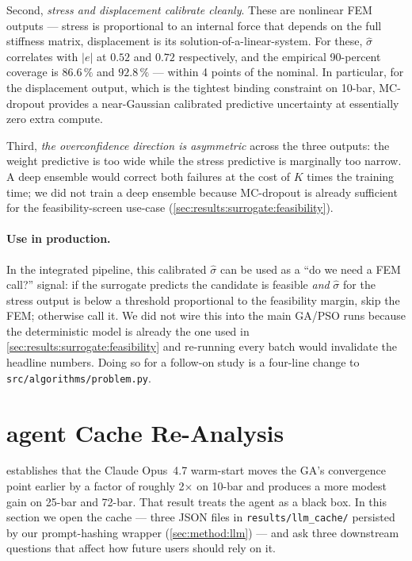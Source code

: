 Second, \emph{stress and displacement calibrate cleanly}. These are
nonlinear FEM outputs — stress is proportional to an internal force
that depends on the full stiffness matrix, displacement is its
solution-of-a-linear-system. For these, $\hat\sigma$ correlates
with $|e|$ at $\num{0.52}$ and $\num{0.72}$ respectively, and the
empirical \num{90}-percent coverage is $\num{86.6}\,\%$ and
$\num{92.8}\,\%$ --- within \num{4} points of the nominal.
In particular, for the displacement output, which is the tightest
binding constraint on \num{10}-bar, MC-dropout provides a
near-Gaussian calibrated predictive uncertainty at essentially
zero extra compute.

Third, \emph{the overconfidence direction is asymmetric} across
the three outputs: the weight predictive is too wide while the
stress predictive is marginally too narrow. A deep ensemble would
correct both failures at the cost of $K$ times the training time;
we did not train a deep ensemble because MC-dropout is already
sufficient for the feasibility-screen use-case
(\cref{sec:results:surrogate:feasibility}).

\paragraph{Use in production.} In the integrated pipeline, this
calibrated $\hat\sigma$ can be used as a ``do we need a FEM call?''
signal: if the surrogate predicts the candidate is feasible
\emph{and} $\hat\sigma$ for the stress output is below a threshold
proportional to the feasibility margin, skip the FEM; otherwise
call it. We did not wire this into the main GA/PSO runs because
the deterministic model is already the one used in
\cref{sec:results:surrogate:feasibility} and re-running every
batch would invalidate the headline numbers. Doing so for a
follow-on study is a four-line change to
\texttt{src/algorithms/problem.py}.

\section{agent Cache Re-Analysis}
\label{sec:results:llm_cache}

 establishes that the Claude Opus~4.7
warm-start moves the GA's convergence point earlier by a factor
of roughly \num{2}$\times$ on 10-bar and produces a more modest
gain on 25-bar and 72-bar. That result treats the agent as a
black box. In this section we open the cache --- three JSON files
in \texttt{results/llm\_cache/} persisted by our prompt-hashing
wrapper (\cref{sec:method:llm}) --- and ask three downstream
questions that affect how future users should rely on it.

